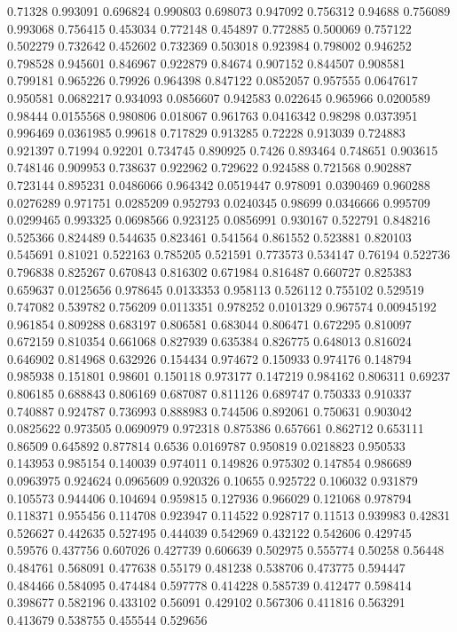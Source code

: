 0.71328 0.993091
0.696824 0.990803
0.698073 0.947092
0.756312 0.94688
0.756089 0.993068
0.756415 0.453034
0.772148 0.454897
0.772885 0.500069
0.757122 0.502279
0.732642 0.452602
0.732369 0.503018
0.923984 0.798002
0.946252 0.798528
0.945601 0.846967
0.922879 0.84674
0.907152 0.844507
0.908581 0.799181
0.965226 0.79926
0.964398 0.847122
0.0852057 0.957555
0.0647617 0.950581
0.0682217 0.934093
0.0856607 0.942583
0.022645 0.965966
0.0200589 0.98444
0.0155568 0.980806
0.018067 0.961763
0.0416342 0.98298
0.0373951 0.996469
0.0361985 0.99618
0.717829 0.913285
0.72228 0.913039
0.724883 0.921397
0.71994 0.92201
0.734745 0.890925
0.7426 0.893464
0.748651 0.903615
0.748146 0.909953
0.738637 0.922962
0.729622 0.924588
0.721568 0.902887
0.723144 0.895231
0.0486066 0.964342
0.0519447 0.978091
0.0390469 0.960288
0.0276289 0.971751
0.0285209 0.952793
0.0240345 0.98699
0.0346666 0.995709
0.0299465 0.993325
0.0698566 0.923125
0.0856991 0.930167
0.522791 0.848216
0.525366 0.824489
0.544635 0.823461
0.541564 0.861552
0.523881 0.820103
0.545691 0.81021
0.522163 0.785205
0.521591 0.773573
0.534147 0.76194
0.522736 0.796838
0.825267 0.670843
0.816302 0.671984
0.816487 0.660727
0.825383 0.659637
0.0125656 0.978645
0.0133353 0.958113
0.526112 0.755102
0.529519 0.747082
0.539782 0.756209
0.0113351 0.978252
0.0101329 0.967574
0.00945192 0.961854
0.809288 0.683197
0.806581 0.683044
0.806471 0.672295
0.810097 0.672159
0.810354 0.661068
0.827939 0.635384
0.826775 0.648013
0.816024 0.646902
0.814968 0.632926
0.154434 0.974672
0.150933 0.974176
0.148794 0.985938
0.151801 0.98601
0.150118 0.973177
0.147219 0.984162
0.806311 0.69237
0.806185 0.688843
0.806169 0.687087
0.811126 0.689747
0.750333 0.910337
0.740887 0.924787
0.736993 0.888983
0.744506 0.892061
0.750631 0.903042
0.0825622 0.973505
0.0690979 0.972318
0.875386 0.657661
0.862712 0.653111
0.86509 0.645892
0.877814 0.6536
0.0169787 0.950819
0.0218823 0.950533
0.143953 0.985154
0.140039 0.974011
0.149826 0.975302
0.147854 0.986689
0.0963975 0.924624
0.0965609 0.920326
0.10655 0.925722
0.106032 0.931879
0.105573 0.944406
0.104694 0.959815
0.127936 0.966029
0.121068 0.978794
0.118371 0.955456
0.114708 0.923947
0.114522 0.928717
0.11513 0.939983
0.42831 0.526627
0.442635 0.527495
0.444039 0.542969
0.432122 0.542606
0.429745 0.59576
0.437756 0.607026
0.427739 0.606639
0.502975 0.555774
0.50258 0.56448
0.484761 0.568091
0.477638 0.55179
0.481238 0.538706
0.473775 0.594447
0.484466 0.584095
0.474484 0.597778
0.414228 0.585739
0.412477 0.598414
0.398677 0.582196
0.433102 0.56091
0.429102 0.567306
0.411816 0.563291
0.413679 0.538755
0.455544 0.529656
